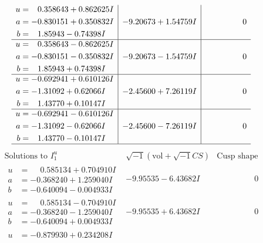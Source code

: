 \documentclass[1p]{elsarticle_modified}
\theoremstyle{definition}
\newcommand{\I}{\sqrt{-1}}
\begin{document}
$$\begin{array}{c|c|c}
\begin{aligned}
u &= \phantom{-}0.358643 + 0.862625 I \\
a &= -0.830151 + 0.350832 I \\
b &= \phantom{-}1.85943 - 0.74398 I\end{aligned}
 & -9.20673 + 1.54759 I & \phantom{-0.000000 } 0 \\ \hline\begin{aligned}
u &= \phantom{-}0.358643 - 0.862625 I \\
a &= -0.830151 - 0.350832 I \\
b &= \phantom{-}1.85943 + 0.74398 I\end{aligned}
 & -9.20673 - 1.54759 I & \phantom{-0.000000 } 0 \\ \hline\begin{aligned}
u &= -0.692941 + 0.610126 I \\
a &= -1.31092 + 0.62066 I \\
b &= \phantom{-}1.43770 + 0.10147 I\end{aligned}
 & -2.45600 + 7.26119 I & \phantom{-0.000000 } 0 \\ \hline\begin{aligned}
u &= -0.692941 - 0.610126 I \\
a &= -1.31092 - 0.62066 I \\
b &= \phantom{-}1.43770 - 0.10147 I\end{aligned}
 & -2.45600 - 7.26119 I & \phantom{-0.000000 } 0\\
 \hline 
 \end{array}$$\newpage$$\begin{array}{c|c|c}  
\text{Solutions to }I^u_{1}& \I (\text{vol} + \sqrt{-1}CS) & \text{Cusp shape}\\
 \hline 
\begin{aligned}
u &= \phantom{-}0.585134 + 0.704910 I \\
a &= -0.368240 + 1.259040 I \\
b &= -0.640094 - 0.004933 I\end{aligned}
 & -9.95535 - 6.43682 I & \phantom{-0.000000 } 0 \\ \hline\begin{aligned}
u &= \phantom{-}0.585134 - 0.704910 I \\
a &= -0.368240 - 1.259040 I \\
b &= -0.640094 + 0.004933 I\end{aligned}
 & -9.95535 + 6.43682 I & \phantom{-0.000000 } 0 \\ \hline\begin{aligned}
u &= -0.879930 + 0.234208 I \\

\end{aligned}
\end{array}$$
\end{document}

